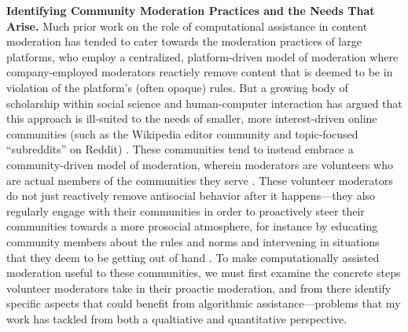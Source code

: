 \documentclass[11pt,letterpaper]{article}
\renewcommand{\section}[1]{\vspace{0.25\baselineskip}\noindent\textbf{#1.}}
\begin{document}
\section{Identifying Community Moderation Practices and the Needs That Arise}
Much prior work on the role of computational assistance in content moderation has tended to cater towards the moderation practices of large platforms, who employ a centralized, platform-driven model of moderation where company-employed moderators reactiely remove content that is deemed to be in violation of the platform's (often opaque) rules.
But a growing body of scholarship within social science and human-computer interaction has argued that this approach is ill-suited to the needs of smaller, more interest-driven online communities (such as the Wikipedia editor community and topic-focused ``subreddits'' on Reddit) \cite{jurgens_just_2019,seering_reconsidering_2020}.
These communities tend to instead embrace a community-driven model of moderation, wherein moderators are volunteers who are actual members of the communities they serve \cite{gilbert_i_2020,lo_when_2018}.
These volunteer moderators do not just reactively remove antisocial behavior after it happens---they also regularly engage with their communities in order to proactively steer their communities towards a more prosocial atmosphere, for instance by educating community members about the rules and norms and intervening in situations that they deem to be getting out of hand \cite{seering_shaping_2017,cai_what_2019,billings_understanding_2010}.
To make computationally assisted moderation useful to these communities, we must first examine the concrete steps volunteer moderators take in their proactie moderation, and from there identify specific aspects that could benefit from algorithmic assistance---problems that my work has tackled from both a qualtiative and quantitative perspective.
\end{document}
